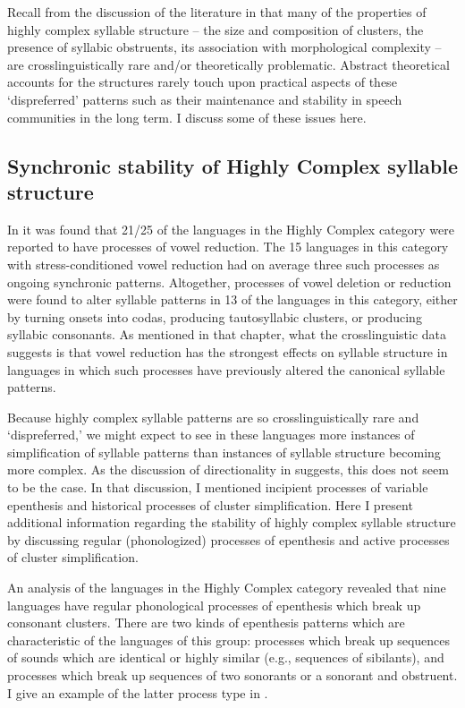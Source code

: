  Recall from the discussion of the literature in  that many of the properties of highly complex syllable structure -- the size and composition of clusters, the presence of syllabic obstruents, its association with morphological complexity -- are crosslinguistically rare and/or theoretically problematic. Abstract theoretical accounts for the structures rarely touch upon practical aspects of these ‘dispreferred’ patterns such as their maintenance and stability in speech communities in the long term. I discuss some of these issues here.

\subsection{Synchronic stability of Highly Complex syllable structure}\label{sec:8.5.1}

  In  it was found that 21/25 of the languages in the Highly Complex category were reported to have processes of vowel reduction. The 15 languages in this category with stress-conditioned vowel reduction had on average three such processes as ongoing synchronic patterns. Altogether, processes of vowel deletion or reduction were found to alter syllable patterns in 13 of the languages in this category, either by turning onsets into codas, producing tautosyllabic clusters, or producing syllabic consonants. As mentioned in that chapter, what the crosslinguistic data suggests is that vowel reduction has the strongest effects on syllable structure in languages in which such processes have previously altered the canonical syllable patterns.

  Because highly complex syllable patterns are so crosslinguistically rare and ‘dispreferred,’ we might expect to see in these languages more instances of simplification of syllable patterns than instances of syllable structure becoming more complex. As the discussion of directionality in  suggests, this does not seem to be the case. In that discussion, I mentioned incipient processes of variable epenthesis and historical processes of cluster simplification. Here I present additional information regarding the stability of highly complex syllable structure by discussing regular (phonologized) processes of epenthesis and active processes of cluster simplification.

  An analysis of the languages in the Highly Complex category revealed that nine languages have regular phonological processes of epenthesis which break up consonant clusters. There are two kinds of epenthesis patterns which are characteristic of the languages of this group: processes which break up sequences of sounds which are identical or highly similar (e.g., sequences of sibilants), and processes which break up sequences of two sonorants or a sonorant and obstruent. I give an example of the latter process type in .

